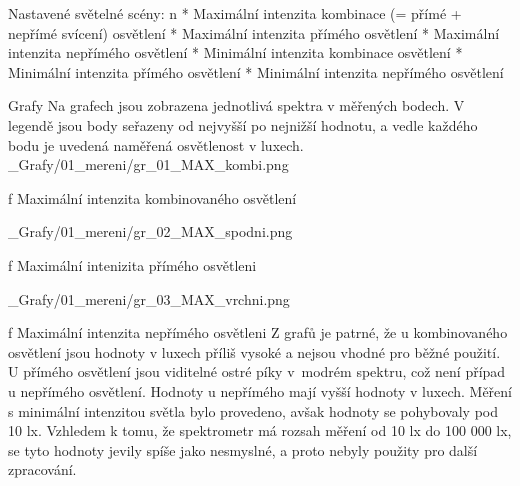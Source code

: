 {\sbf Nastavené světelné scény:}
\medskip
\begitems \style n
    * Maximální intenzita kombinace (= přímé + nepřímé svícení) osvětlení
    * Maximální intenzita přímého osvětlení
    * Maximální intenzita nepřímého osvětlení
    * Minimální intenzita kombinace osvětlení
    * Minimální intenzita přímého osvětlení
    * Minimální intenzita nepřímého osvětlení
\enditems

\secc Grafy
Na grafech jsou zobrazena jednotlivá spektra v měřených bodech. V legendě jsou body seřazeny od nejvyšší po nejnižší hodnotu, a vedle každého bodu je uvedená naměřená osvětlenost v luxech.
\medskip {}
\picw=15cm _Grafy/01_mereni/gr_01_MAX_kombi.png
\caption/f Maximální intenzita kombinovaného osvětlení

\medskip {}
\picw=15cm _Grafy/01_mereni/gr_02_MAX_spodni.png
\caption/f Maximální intenizita přímého osvětleni

\medskip {}
\picw=15cm _Grafy/01_mereni/gr_03_MAX_vrchni.png
\caption/f Maximální intenzita nepřímého osvětleni
\medskip
Z grafů je patrné, že u kombinovaného osvětlení jsou hodnoty v luxech příliš vysoké a nejsou vhodné pro běžné použití. U přímého osvětlení jsou viditelné ostré píky v~modrém spektru, což není případ u nepřímého osvětlení. Hodnoty u nepřímého mají vyšší hodnoty v luxech.
\medskip
Měření s minimální intenzitou světla bylo provedeno, avšak hodnoty se pohybovaly pod 10 lx. Vzhledem k tomu, že spektrometr má rozsah měření od 10 lx do 100 000 lx, se tyto hodnoty jevily spíše jako nesmyslné, a proto nebyly použity pro další zpracování.


